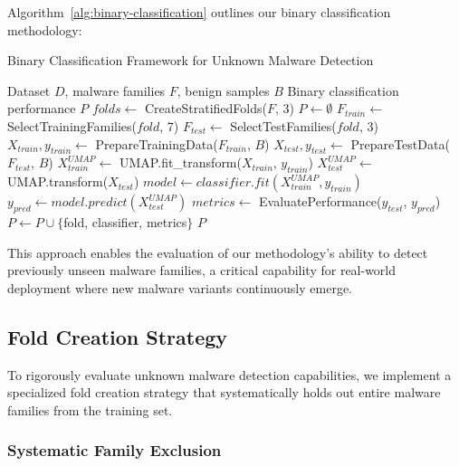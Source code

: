 Algorithm~\ref{alg:binary-classification} outlines our binary classification methodology:

\begin{algorithm}[!htbp]
\caption{Binary Classification Framework for Unknown Malware Detection}
\label{alg:binary-classification}
\begin{algorithmic}[1]
\Require Dataset $D$, malware families $F$, benign samples $B$
\Ensure Binary classification performance $P$
\State $folds \leftarrow$ CreateStratifiedFolds($F$, 3) 
\State $P \leftarrow \emptyset$
    \State $F_{train} \leftarrow$ SelectTrainingFamilies($fold$, 7) 
    \State $F_{test} \leftarrow$ SelectTestFamilies($fold$, 3) 
    \State $X_{train}, y_{train} \leftarrow$ PrepareTrainingData($F_{train}$, $B$)
    \State $X_{test}, y_{test} \leftarrow$ PrepareTestData($F_{test}$, $B$)
    \State $X_{train}^{UMAP} \leftarrow$ UMAP.fit\_transform($X_{train}$, $y_{train}$)
    \State $X_{test}^{UMAP} \leftarrow$ UMAP.transform($X_{test}$)
        \State $model \leftarrow classifier.fit(X_{train}^{UMAP}, y_{train})$
        \State $y_{pred} \leftarrow model.predict(X_{test}^{UMAP})$
        \State $metrics \leftarrow$ EvaluatePerformance($y_{test}$, $y_{pred}$)
        \State $P \leftarrow P \cup \{$fold, classifier, metrics$\}$
    \EndFor
\EndFor
\Return $P$
\end{algorithmic}
\end{algorithm}

This approach enables the evaluation of our methodology's ability to detect previously unseen malware families, a critical capability for real-world deployment where new malware variants continuously emerge.

\subsection{Fold Creation Strategy}
\label{subsec:fold-creation}

To rigorously evaluate unknown malware detection capabilities, we implement a specialized fold creation strategy that systematically holds out entire malware families from the training set.

\subsubsection{Systematic Family Exclusion}

